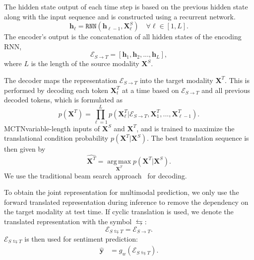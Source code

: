 \documentclass[letterpaper]{article} %
\newcommand{\citep}{\cite}
\newcommand{\ours}{MCTN}
\begin{document}
%
%
The hidden state output of each time step is based on the previous hidden state along with the input sequence and is constructed using a recurrent network.
\begin{equation}
\mathbf{h}_\ell = \mathtt{RNN}(\mathbf{h}_{\ell-1}, \mathbf{X}^{S}_\ell) \quad \forall \ell \in [1,L].
\end{equation}
The encoder's output is the concatenation of all hidden states of the encoding RNN,
\begin{equation}
\mathcal{E}_{S \rightarrow T} = [\mathbf{h}_{1}, \mathbf{h}_{2}, ..., \mathbf{h}_{L}],
\end{equation}
where $L$ is the length of the source modality $\mathbf{X}^{S}$.

The decoder maps the representation $\mathcal{E}_{S \rightarrow T}$ into the target modality $\mathbf{X}^{T}$. This is performed by decoding each token $\mathbf{X}^{T}_t$ at a time based on $\mathcal{E}_{S \rightarrow T}$ and all previous decoded tokens, which is formulated as
\begin{equation}
p(\mathbf{X}^{T}) = \prod_{\ell=1}^{L} p(\mathbf{X}^{T}_\ell|\mathcal{E}_{S \rightarrow T}, \mathbf{X}^{T}_1, ..., \mathbf{X}^{T}_{\ell-1}).
\end{equation}
\ours \accepts variable-length inputs of $\mathbf{X}^{S}$ and $\mathbf{X}^{T}$, and is trained to maximize the translational condition probability $p(\mathbf{X}^{T}|\mathbf{X}^{S})$. The best translation sequence is then given by
\begin{equation}
\hat{\mathbf{X}^{T}} = \operatorname*{arg\,max}_{\mathbf{X}^{T}} p(\mathbf{X}^{T}|\mathbf{X}^{S}).
\end{equation}
%
We use the traditional beam search approach~\citep{seq2seq_nn} 
for decoding. 

To obtain the joint representation for multimodal prediction, we 
only use
the forward translated representation during inference 
to remove the 
dependency on the target modality at test time.
If cyclic translation is used, we denote the translated representation with the symbol $\leftrightarrows$: 
\begin{equation}{\mathcal{E}}_{S \leftrightarrows T} = {\mathcal{E}}_{S \rightarrow T}.
\end{equation}
${\mathcal{E}}_{S \leftrightarrows T}$ is then used for sentiment prediction:
\begin{align}
\hat{\mathbf{y}}_{} &= g_{w}({\mathcal{E}}_{S \leftrightarrows T}).
\end{align}
\end{document}
